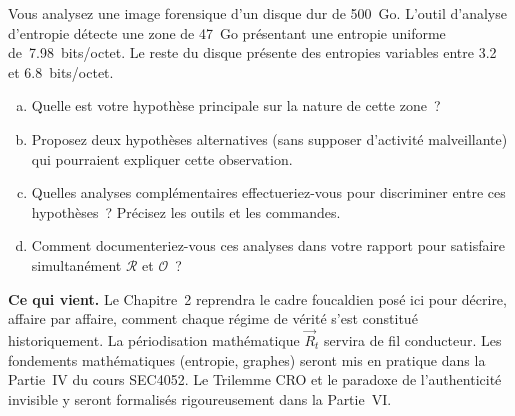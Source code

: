 \begin{boxexo}[title={\ding{45}\quad Exercice~1.3. Réflexion sur l'entropie \niveauexpert}]
Vous analysez une image forensique d'un disque dur de 500~Go. L'outil
d'analyse d'entropie détecte une zone de 47~Go présentant une entropie
uniforme de~7.98~bits/octet. Le reste du disque présente des entropies
variables entre 3.2 et 6.8~bits/octet.

\begin{enumerate}[(a)]
    \item Quelle est votre hypothèse principale sur la nature de cette zone~?
    \item Proposez deux hypothèses alternatives (sans supposer d'activité
          malveillante) qui pourraient expliquer cette observation.
    \item Quelles analyses complémentaires effectueriez-vous pour discriminer
          entre ces hypothèses~? Précisez les outils et les commandes.
    \item Comment documenteriez-vous ces analyses dans votre rapport pour
          satisfaire simultanément $\mathcal{R}$ et $\mathcal{O}$~?
\end{enumerate}
\end{boxexo}

\bigskip

\begin{boxinfo}
\textbf{Ce qui vient.} Le Chapitre~2 reprendra le cadre foucaldien posé
ici pour décrire, affaire par affaire, comment chaque régime de vérité
s'est constitué historiquement. La périodisation mathématique
$\vec{R}_t$ servira de fil conducteur. Les fondements mathématiques
(entropie, graphes) seront mis en pratique dans la Partie~IV du cours
SEC4052. Le Trilemme CRO et le paradoxe de l'authenticité invisible y
seront formalisés rigoureusement dans la Partie~VI.
\end{boxinfo}
